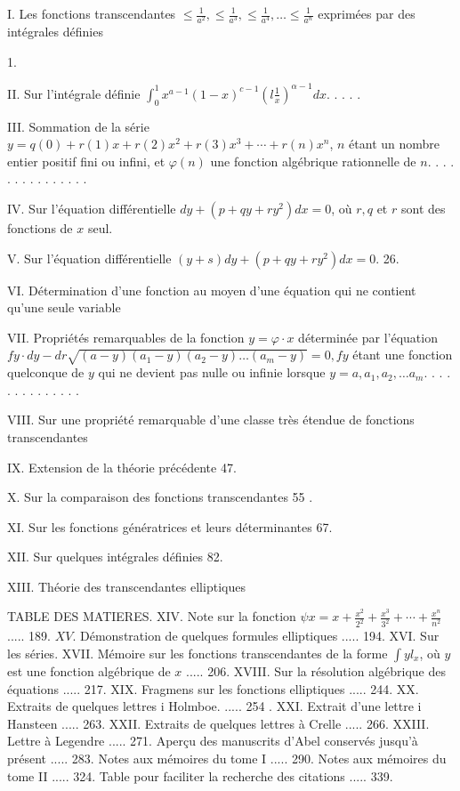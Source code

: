 \documentclass{article}
\begin{document}
I. Les fonctions transcendantes \(\leq \frac{1}{a^{2}}, \leq \frac{1}{a^{3}}, \leq \frac{1}{a^{4}}, \ldots \leq \frac{1}{a^{n}}\) exprimées par des intégrales définies

1.

II. Sur l'intégrale définie \(\int_{0}^{1} x^{a-1}(1-x)^{c-1}\left(l \frac{1}{x}\right)^{\alpha-1} d x\). . . . .

III. Sommation de la série \(y=q(0)+r(1) x+r(2) x^{2}+r(3) x^{3}+\cdots+r(n) x^{n}\), \(n\) étant un nombre entier positif fini ou infini, et \(\varphi(n)\) une fonction algébrique rationnelle de \(n\). . . . . . . . . . . . . . .

IV. Sur l'équation différentielle \(d y+\left(p+q y+r y^{2}\right) d x=0\), où \(r, q\) et \(r\) sont des fonctions de \(x\) seul.

V. Sur l'équation différentielle \((y+s) d y+\left(p+q y+r y^{2}\right) d x=0\). 26.

VI. Détermination d'une fonction au moyen d'une équation qui ne contient qu'une seule variable

VII. Propriétés remarquables de la fonction \(y=\varphi \cdot x\) déterminée par l'équation \(f y \cdot d y-d r \sqrt{(a-y)\left(a_{1}-y\right)\left(a_{2}-y\right) \ldots\left(a_{m}-y\right)}=0, f y\) étant une fonction quelconque de \(y\) qui ne devient pas nulle ou infinie lorsque \(y=a, a_{1}, a_{2}, \ldots a_{m}\). . . . . . . . . . . . . .

VIII. Sur une propriété remarquable d'une classe très étendue de fonctions transcendantes

IX. Extension de la théorie précédente 47.

X. Sur la comparaison des fonctions transcendantes 55 .

XI. Sur les fonctions génératrices et leurs déterminantes 67.

XII. Sur quelques intégrales définies 82.

XIII. Théorie des transcendantes elliptiques

TABLE DES MATIERES.
XIV. Note sur la fonction \(\psi x=x+\frac{x^{2}}{2^{2}}+\frac{x^{3}}{3^{2}}+\cdots+\frac{x^{n}}{n^{2}}\) ..... 189.
\(X V\). Démonstration de quelques formules elliptiques ..... 194.
XVI. Sur les séries.
XVII. Mémoire sur les fonctions transcendantes de la forme \(\int y l_{x}\), où \(y\) est une fonction algébrique de \(x\) ..... 206.
XVIII. Sur la résolution algébrique des équations ..... 217.
XIX. Fragmens sur les fonctions elliptiques ..... 244.
XX. Extraits de quelques lettres i Holmboe. ..... 254 .
XXI. Extrait d'une lettre i Hansteen ..... 263.
XXII. Extraits de quelques lettres à Crelle ..... 266.
XXIII. Lettre à Legendre ..... 271.
Aperçu des manuscrits d'Abel conservés jusqu'à présent ..... 283.
Notes aux mémoires du tome I ..... 290.
Notes aux mémoires du tome II ..... 324.
Table pour faciliter la recherche des citations ..... 339.
\end{document}
